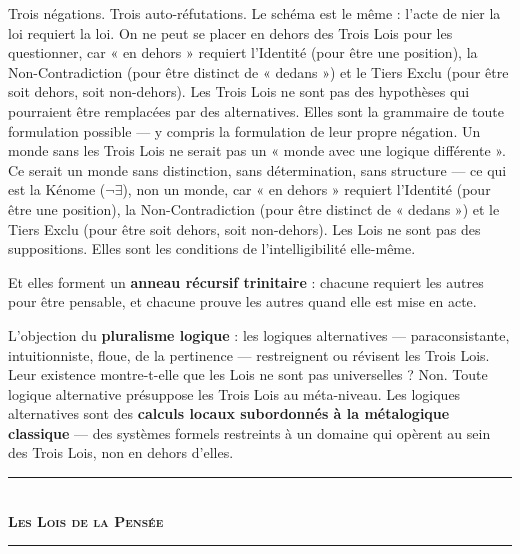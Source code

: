 \documentclass[10pt, openany, oneside]{book}
\renewcommand{\normalsize}{\fontsize{10}{13}\selectfont}
\begin{document}
Trois négations. Trois auto-réfutations. Le schéma est le même : l'acte de nier la loi requiert la loi. On ne peut se placer en dehors des Trois Lois pour les questionner, car « en dehors » requiert l'Identité (pour être une position), la Non-Contradiction (pour être distinct de « dedans ») et le Tiers Exclu (pour être soit dehors, soit non-dehors). Les Trois Lois ne sont pas des hypothèses qui pourraient être remplacées par des alternatives. Elles sont la grammaire de toute formulation possible --- y compris la formulation de leur propre négation. Un monde sans les Trois Lois ne serait pas un « monde avec une logique différente ». Ce serait un monde sans distinction, sans détermination, sans structure --- ce qui est la Kénome ($\neg\exists$), non un monde, car « en dehors » requiert l'Identité (pour être une position), la Non-Contradiction (pour être distinct de « dedans ») et le Tiers Exclu (pour être soit dehors, soit non-dehors). Les Lois ne sont pas des suppositions. Elles sont les conditions de l'intelligibilité elle-même.

Et elles forment un \textbf{anneau récursif trinitaire} : chacune requiert les autres pour être pensable, et chacune prouve les autres quand elle est mise en acte.

L'objection du \textbf{pluralisme logique} : les logiques alternatives --- paraconsistante, intuitionniste, floue, de la pertinence --- restreignent ou révisent les Trois Lois. Leur existence montre-t-elle que les Lois ne sont pas universelles ? Non. Toute logique alternative présuppose les Trois Lois au méta-niveau. Les logiques alternatives sont des \textbf{calculs locaux subordonnés à la métalogique classique} --- des systèmes formels restreints à un domaine qui opèrent au sein des Trois Lois, non en dehors d'elles.

\vspace{1.5em}


\begin{center}
    \rule{0.3\textwidth}{0.4pt}\\[0.5em]
    {\normalsize\bfseries\scshape Les Lois de la Pensée}\\[0.3em]
    \rule{0.3\textwidth}{0.4pt}
\end{center}

\vspace{1em}
\end{document}
